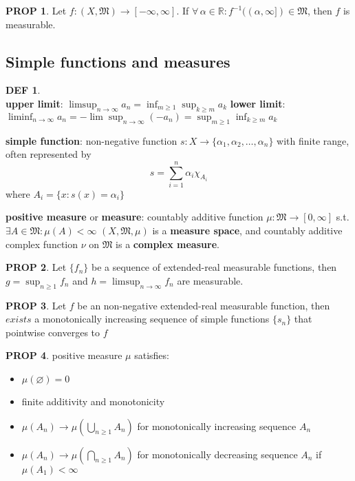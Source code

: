\documentclass[hidelinks,10pt]{article}
\theoremstyle{definition}
\newtheorem*{defin}{DEF}
\theoremstyle{dotles}
\theoremstyle{dotless}
\newtheorem{proposition}{PROP}[section]
\theoremstyle{remark}
\begin{document}
\begin{proposition}\label{Prop 1.2}
Let $f:(X,\mathfrak{M})\to[-\infty,\infty]$. If $\forall\,\alpha\in\mathbb{R}:f^{-1}((\alpha,\infty])\in\mathfrak{M}$, then $f$ is measurable.
\end{proposition}

\subsection{Simple functions and measures}

\begin{defin}~\\
\textbf{upper limit}: $\limsup_{n\to\infty}a_n=\inf_{m\geq1}\sup_{k\geq m}a_k$\newline
\textbf{lower limit}: $\liminf_{n\to\infty}a_n=-\lim\sup_{n\to\infty}(-a_n)=\sup_{m\geq1}\inf_{k\geq m}a_k$\bigbreak

\textbf{simple function}: non-negative function $s:X\to\{\alpha_1,\alpha_2,\dots,\alpha_n\}$ with finite range, often represented by
\[s=\sum_{i=1}^n\alpha_i\chi_{A_i}\]
where $A_i=\{x:s(x)=\alpha_i\}$\bigbreak

\textbf{positive measure} or \textbf{measure}: countably additive function $\mu:\mathfrak{M}\to[0,\infty]$ s.t. $\exists A\in\mathfrak{M}:\mu(A)<\infty$\newline
$(X,\mathfrak{M},\mu)$ is a \textbf{measure space}, and countably additive complex function $\nu$ on $\mathfrak{M}$ is a \textbf{complex measure}.
\end{defin}

\begin{proposition}
Let $\{f_n\}$ be a sequence of extended-real measurable functions, then $g=\sup_{n\geq1}f_n$ and $h=\limsup_{n\to\infty}f_n$ are measurable.
\end{proposition}

\begin{proposition}
Let $f$ be an non-negative extended-real measurable function, then $exists$ a monotonically increasing sequence of simple functions $\{s_n\}$ that pointwise converges to $f$
\end{proposition}

\begin{proposition}
positive measure $\mu$ satisfies:\begin{itemize}
    \item $\mu(\varnothing)=0$
    \item finite additivity and monotonicity
    \item {} $\mu(A_n)\to\mu(\bigcup_{n\geq1}A_n)$ for monotonically increasing sequence $A_n$
    \item {} $\mu(A_n)\to\mu(\bigcap_{n\geq1}A_n)$ for monotonically decreasing sequence $A_n$ if $\mu(A_1)<\infty$
\end{itemize}
\end{proposition}
\end{document}
